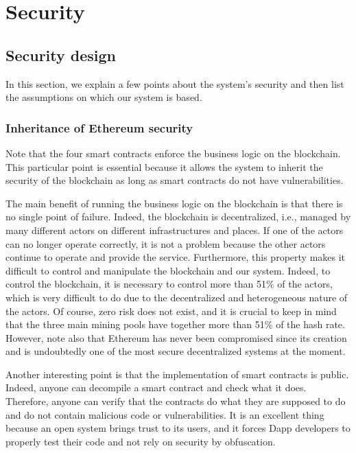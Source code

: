\documentclass[a4paper,11pt,oneside]{report}
\begin{document}
\chapter{Security}

\section{Security design}
In this section, we explain a few points about the system's security and then list the assumptions on which our system is based.

\subsection{Inheritance of Ethereum security}
Note that the four smart contracts enforce the business logic on the blockchain. This particular point is essential because it allows the system to inherit the security of the blockchain as long as smart contracts do not have vulnerabilities.

The main benefit of running the business logic on the blockchain is that there is no single point of failure. Indeed, the blockchain is decentralized, i.e., managed by many different actors on different infrastructures and places. If one of the actors can no longer operate correctly, it is not a problem because the other actors continue to operate and provide the service. Furthermore, this property makes it difficult to control and manipulate the blockchain and our system. Indeed, to control the blockchain, it is necessary to control more than 51\% of the actors, which is very difficult to do due to the decentralized and heterogeneous nature of the actors. Of course, zero risk does not exist, and it is crucial to keep in mind that the three main mining pools have together more than 51\% of the hash rate. However, note also that Ethereum has never been compromised since its creation and is undoubtedly one of the most secure decentralized systems at the moment.

Another interesting point is that the implementation of smart contracts is public. Indeed, anyone can decompile a smart contract and check what it does. Therefore, anyone can verify that the contracts do what they are supposed to do and do not contain malicious code or vulnerabilities. It is an excellent thing because an open system brings trust to its users, and it forces Dapp developers to properly test their code and not rely on security by obfuscation. 
\end{document}
